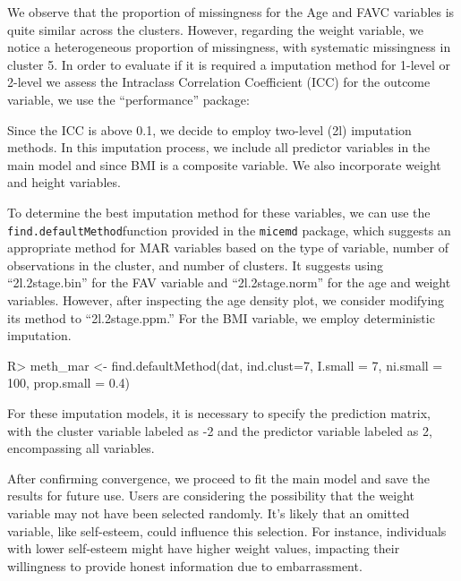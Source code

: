 \documentclass[
]{jss}
\begin{document}
We observe that the proportion of missingness for the Age and FAVC
variables is quite similar across the clusters. However, regarding the
weight variable, we notice a heterogeneous proportion of missingness,
with systematic missingness in cluster 5. In order to evaluate if it is
required a imputation method for 1-level or 2-level we assess the
Intraclass Correlation Coefficient (ICC) for the outcome variable, we
use the ``performance'' package:

\begin{CodeChunk}
\end{CodeChunk}

Since the ICC is above 0.1, we decide to employ two-level (2l)
imputation methods. In this imputation process, we include all predictor
variables in the main model and since BMI is a composite variable. We
also incorporate weight and height variables.

To determine the best imputation method for these variables, we can use
the \texttt{find.defaultMethod}function provided in the \texttt{micemd}
package, which suggests an appropriate method for MAR variables based on
the type of variable, number of observations in the cluster, and number
of clusters. It suggests using ``2l.2stage.bin'' for the FAV variable
and ``2l.2stage.norm'' for the age and weight variables. However, after
inspecting the age density plot, we consider modifying its method to
``2l.2stage.ppm.'' For the BMI variable, we employ deterministic
imputation.

\begin{CodeChunk}
\begin{CodeInput}
R> meth_mar <- find.defaultMethod(dat, ind.clust=7, I.small = 7, ni.small = 100, prop.small = 0.4)
\end{CodeInput}
\end{CodeChunk}

For these imputation models, it is necessary to specify the prediction
matrix, with the cluster variable labeled as -2 and the predictor
variable labeled as 2, encompassing all variables.

After confirming convergence, we proceed to fit the main model and save
the results for future use. Users are considering the possibility that
the weight variable may not have been selected randomly. It's likely
that an omitted variable, like self-esteem, could influence this
selection. For instance, individuals with lower self-esteem might have
higher weight values, impacting their willingness to provide honest
information due to embarrassment.
\end{document}
